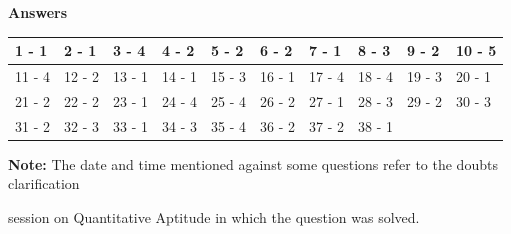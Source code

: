 \documentclass{article}
\begin{document}
	\noindent 
	
	\noindent 
	
	\noindent 
	
	\noindent 
	
	\noindent 
	
	\noindent 
	
	\noindent 
	
	\noindent 
	
	\noindent 
	
	\noindent 
	
	\noindent \textbf{Answers}
	
	\noindent 
	
	\noindent 
	
	\begin{tabular}{|p{0.7in}|p{0.5in}|p{0.4in}|p{0.5in}|p{0.5in}|p{0.4in}|p{0.5in}|p{0.4in}|p{0.5in}|p{0.4in}|} \hline 
		1 - 1 & 2 - 1 & 3 - 4 & 4 - 2 & 5 - 2 & 6 - 2 & 7 - 1 & 8 - 3 & 9 - 2 & 10 - 5 \\ \hline 
		11 - 4 & 12 - 2 & 13 - 1 & 14 - 1 & 15 - 3 & 16 - 1 & 17 - 4 & 18 - 4 & 19 - 3 & 20 - 1 \\ \hline 
		21 - 2 & 22 - 2 & 23 - 1 & 24 - 4 & 25 - 4 & 26 - 2 & 27 - 1 & 28 - 3 & 29 - 2 & 30 - 3 \\ \hline 
		31 - 2 & 32 - 3 & 33 - 1 & 34 - 3 & 35 - 4 & 36 - 2 & 37 - 2 & 38 - 1 &  &  \\ \hline 
	\end{tabular}
	
	
	
	\noindent 
	
	\noindent 
	
	\noindent \textbf{Note: }The date and time mentioned against some questions refer to the doubts clarification
	
	\noindent session on Quantitative Aptitude in which the question was solved.
	
	\noindent 
	
	\noindent 
	
	\noindent 
	
	\noindent 
	
	\noindent 
	
	\noindent 
	
	\noindent 
	
	\noindent 
	
	\noindent 
	
	\noindent 
	
	\noindent 
	
	\noindent 
	
	\noindent 
	
\end{document}
